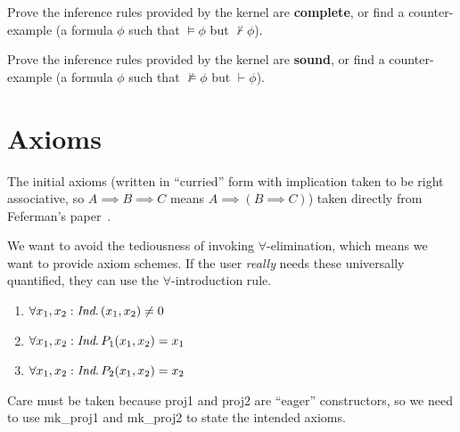 \begin{xca}
Prove the inference rules provided by the kernel are \textbf{complete}, or find
a counter-example (a formula $\phi$ such that $\models\phi$ but $\nvdash\phi$).
\end{xca}

\begin{xca}
Prove the inference rules provided by the kernel are \textbf{sound}, or find
a counter-example (a formula $\phi$ such that $\nvDash\phi$ but $\vdash\phi$).
\end{xca}

\section*{Axioms}

\begin{node}
  The initial axioms (written in ``curried'' form with implication
  taken to be right associative, so $A\implies B\implies C$ means
  $A\implies(B\implies C)$) taken directly from
  Feferman's paper~\cite[\S16]{feferman1989finitary}.
\end{node}

\begin{node}
We want to avoid the tediousness of invoking $\forall$-elimination,
which means we want to provide axiom schemes. If the user
\emph{really} needs these universally quantified, they can use the
$\forall$-introduction rule.
\begin{enumerate}
  \item $\forall x_{1},x_{2}:\textit{Ind}\ldotp (x_{1},x_{2})\neq0$
  \item $\forall x_{1},x_{2}:\textit{Ind}\ldotp P_{1}(x_{1},x_{2})=x_{1}$
  \item $\forall x_{1},x_{2}:\textit{Ind}\ldotp P_{2}(x_{1},x_{2})=x_{2}$
\end{enumerate}
Care must be taken because {\Tt{}proj1\nwendquote} and {\Tt{}proj2\nwendquote} are ``eager''
constructors, so we need to use {\Tt{}mk{\_}proj1\nwendquote} and {\Tt{}mk{\_}proj2\nwendquote} to state
the intended axioms.
\end{node}

